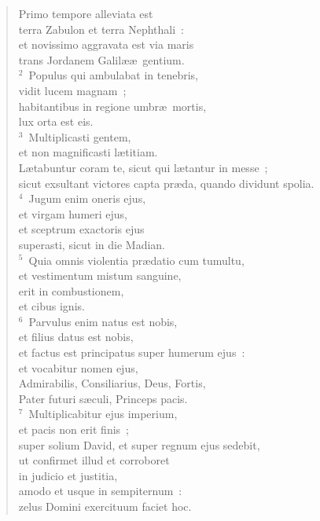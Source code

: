 \begin{flushleft}\begin{verse}\vspace{-19pt}Primo tempore alleviata est\\ terra Zabulon et terra Nephthali~:\\ et novissimo aggravata est via maris\\ trans Jordanem Galil\ae \ae\ gentium.\\
${}^{2}$~Populus qui ambulabat in tenebris,\\ vidit lucem magnam~;\\ habitantibus in regione umbr\ae\ mortis,\\ lux orta est eis.\\
${}^{3}$~Multiplicasti gentem,\\ et non magnificasti l\ae titiam.\\ L\ae tabuntur coram te, sicut qui l\ae tantur in messe~;\\ sicut exsultant victores capta pr\ae da, quando dividunt spolia.\\
${}^{4}$~Jugum enim oneris ejus,\\ et virgam humeri ejus,\\ et sceptrum exactoris ejus\\ superasti, sicut in die Madian.\\
${}^{5}$~Quia omnis violentia pr\ae datio cum tumultu,\\ et vestimentum mistum sanguine,\\ erit in combustionem,\\ et cibus ignis.\\
${}^{6}$~Parvulus enim natus est nobis,\\ et filius datus est nobis,\\ et factus est principatus super humerum ejus~:\\ et vocabitur nomen ejus,\\ Admirabilis, Consiliarius, Deus, Fortis,\\ Pater futuri s\ae culi, Princeps pacis.\\
${}^{7}$~Multiplicabitur ejus imperium,\\ et pacis non erit finis~;\\ super solium David, et super regnum ejus sedebit,\\ ut confirmet illud et corroboret\\ in judicio et justitia,\\ amodo et usque in sempiternum~:\\ zelus Domini exercituum faciet hoc.\end{verse}\end{flushleft}


